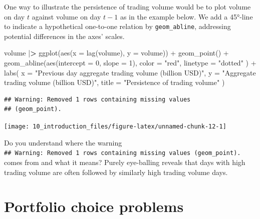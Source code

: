 \documentclass[
]{krantz}
\newenvironment{Shaded}{\begin{snugshade}}{\end{snugshade}}
\newcommand{\AttributeTok}[1]{\textcolor[rgb]{0.61,0.61,0.61}{#1}}
\newcommand{\DecValTok}[1]{\textcolor[rgb]{0.06,0.06,0.06}{#1}}
\newcommand{\ErrorTok}[1]{\textcolor[rgb]{0.14,0.14,0.14}{\textbf{#1}}}
\newcommand{\FunctionTok}[1]{\textcolor[rgb]{0,0,0}{#1}}
\newcommand{\NormalTok}[1]{#1}
\newcommand{\SpecialCharTok}[1]{\textcolor[rgb]{0,0,0}{#1}}
\newcommand{\StringTok}[1]{\textcolor[rgb]{0.5,0.5,0.5}{#1}}
\begin{document}
One way to illustrate the persistence of trading volume would be to plot volume on day \(t\) against volume on day \(t-1\) as in the example below. We add a 45°-line to indicate a hypothetical one-to-one relation by \texttt{geom\_abline}, addressing potential differences in the axes' scales.

\begin{Shaded}
\begin{Highlighting}[]
\NormalTok{volume }\SpecialCharTok{|}\ErrorTok{\textgreater{}}
  \FunctionTok{ggplot}\NormalTok{(}\FunctionTok{aes}\NormalTok{(}\AttributeTok{x =} \FunctionTok{lag}\NormalTok{(volume), }\AttributeTok{y =}\NormalTok{ volume)) }\SpecialCharTok{+}
  \FunctionTok{geom\_point}\NormalTok{() }\SpecialCharTok{+}
  \FunctionTok{geom\_abline}\NormalTok{(}\FunctionTok{aes}\NormalTok{(}\AttributeTok{intercept =} \DecValTok{0}\NormalTok{, }\AttributeTok{slope =} \DecValTok{1}\NormalTok{),}
    \AttributeTok{color =} \StringTok{"red"}\NormalTok{,}
    \AttributeTok{linetype =} \StringTok{"dotted"}
\NormalTok{  ) }\SpecialCharTok{+}
  \FunctionTok{labs}\NormalTok{(}
    \AttributeTok{x =} \StringTok{"Previous day aggregate trading volume (billion USD)"}\NormalTok{,}
    \AttributeTok{y =} \StringTok{"Aggregate trading volume (billion USD)"}\NormalTok{,}
    \AttributeTok{title =} \StringTok{"Persistence of trading volume"}
\NormalTok{  )}
\end{Highlighting}
\end{Shaded}

\begin{verbatim}
## Warning: Removed 1 rows containing missing values
## (geom_point).
\end{verbatim}

\begin{center}\texttt{[image: 10\_introduction\_files/figure-latex/unnamed-chunk-12-1]} \end{center}

Do you understand where the warning \texttt{\#\#\ Warning:\ Removed\ 1\ rows\ containing\ missing\ values\ (geom\_point).} comes from and what it means? Purely eye-balling reveals that days with high trading volume are often followed by similarly high trading volume days.

\hypertarget{portfolio-choice-problems}{%
\section{Portfolio choice problems}\label{portfolio-choice-problems}}
\end{document}
